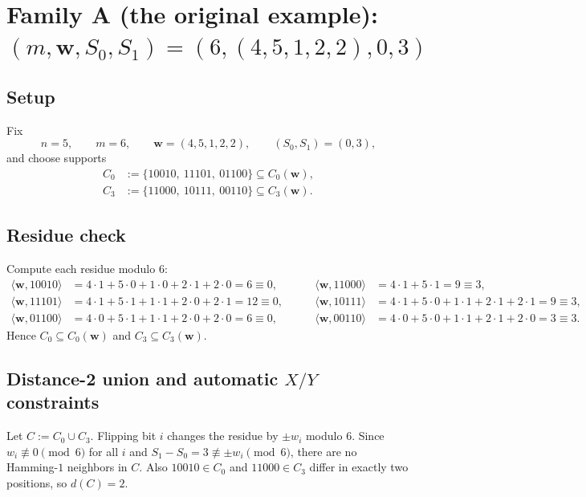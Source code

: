 \documentclass[11pt]{article}
\begin{document}
\bigskip

\section{Family A (the original example): $(m,\mathbf w,S_0,S_1)=(6,(4,5,1,2,2),0,3)$}

\subsection{Setup}
Fix
\[
n=5,\qquad m=6,\qquad \mathbf w=(4,5,1,2,2),\qquad (S_0,S_1)=(0,3),
\]
and choose supports
\[
\begin{aligned}
C_0 &:= \{10010,\ 11101,\ 01100\}\subseteq C_{0}(\mathbf w),\\
C_3 &:= \{11000,\ 10111,\ 00110\}\subseteq C_{3}(\mathbf w).
\end{aligned}
\]

\subsection{Residue check}
Compute each residue modulo $6$:
\[
\begin{aligned}
\langle \mathbf w,10010\rangle &=4\cdot 1+5\cdot 0+1\cdot 0+2\cdot 1+2\cdot 0=6\equiv 0,\\
\langle \mathbf w,11101\rangle &=4\cdot 1+5\cdot 1+1\cdot 1+2\cdot 0+2\cdot 1=12\equiv 0,\\
\langle \mathbf w,01100\rangle &=4\cdot 0+5\cdot 1+1\cdot 1+2\cdot 0+2\cdot 0=6\equiv 0,
\end{aligned}
\qquad
\begin{aligned}
\langle \mathbf w,11000\rangle &=4\cdot 1+5\cdot 1=9\equiv 3,\\
\langle \mathbf w,10111\rangle &=4\cdot 1+5\cdot 0+1\cdot 1+2\cdot 1+2\cdot 1=9\equiv 3,\\
\langle \mathbf w,00110\rangle &=4\cdot 0+5\cdot 0+1\cdot 1+2\cdot 1+2\cdot 0=3\equiv 3.
\end{aligned}
\]
Hence $C_0\subseteq C_0(\mathbf w)$ and $C_3\subseteq C_3(\mathbf w)$.

\subsection{Distance-2 union and automatic $X/Y$ constraints}
Let $C:=C_0\cup C_3$.
Flipping bit $i$ changes the residue by $\pm w_i$ modulo $6$.
Since $w_i\not\equiv 0\pmod 6$ for all $i$ and $S_1-S_0=3\not\equiv \pm w_i\pmod 6$,
there are no Hamming-$1$ neighbors in $C$.
Also $10010\in C_0$ and $11000\in C_3$ differ in exactly two positions, so $d(C)=2$.
\end{document}
